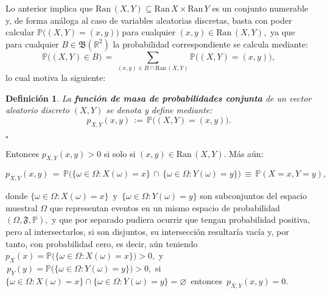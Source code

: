 \documentclass[spanish,10pt,letterpaper]{article}
\newtheorem{defi}{Definición}
\newcommand{\prob}{\mathbb{P}}
\newcommand{\Runo}{\mathbb{R}}
\newcommand{\qed}{\begin{flushright}$\square$\end{flushright}}
\begin{document}
Lo anterior implica que $\text{Ran}\,(X,Y)\subseteq\text{Ran}\,X\times\text{Ran}\,Y$ es un conjunto numerable y, de forma análoga al caso de variables aleatorias discretas, basta con poder calcular $\prob\big((X,Y)=(x,y)\big)$ para cualquier $(x,y)\in\text{Ran}\,(X,Y),$ ya que para cualquier $B\in\mathfrak{B}(\Runo^2)$ la probabilidad correspondiente se calcula mediante:
\begin{equation}\label{eq:probdiscreta}
    \prob\big((X,Y)\in B\big) \,=\, \sum_{(x,y)\in B\cap\text{Ran}\,(X,Y)}\prob\big((X,Y)=(x,y)\big),
\end{equation}
lo cual motiva la siguiente:

\bigskip

\begin{defi}\label{def:fmpconjunta}
    La \textbf{función de masa de probabilidades conjunta} de un vector aleatorio discreto $(X,Y)$ se denota y define mediante: $$p_{X,Y}(x,y) \,:=\, \prob\big((X,Y)=(x,y)\big).$$ \qed 
\end{defi}

\noindent Entonces $p_{X,Y}(x,y)>0$ si solo si $(x,y)\in\text{Ran}\,(X,Y).$ Más aún:

\begin{equation}\label{eq:fmpconjunta}
    p_{X,Y}(x,y) \,=\, \prob\big(\{\omega\in\Omega:X(\omega)=x\}\,\cap\,\{\omega\in\Omega:Y(\omega)=y\}\big) \,\equiv\, \prob(X=x,Y=y),
\end{equation}

\medskip 

\noindent donde $\{\omega\in\Omega:X(\omega)=x\}\,$ y $\,\{\omega\in\Omega:Y(\omega)=y\}$ son subconjuntos del espacio muestral $\Omega$ que representan eventos en un mismo espacio de probabilidad $(\Omega,\mathfrak{F},\prob),$ y que por separado pudiera ocurrir que tengan probabilidad positiva, pero al intersectarlos, si son disjuntos, su intersección resultaría vacía y, por tanto, con probabilidad cero, es decir, aún teniendo $p_X(x)=\prob\big(\{\omega\in\Omega:X(\omega)=x\}\big)>0,$ y $\,p_Y(y)=\prob\big(\{\omega\in\Omega:Y(\omega)=y\}\big)>0,$ si $\{\omega\in\Omega:X(\omega)=x\}\cap\{\omega\in\Omega:Y(\omega)=y\}=\varnothing\,$ entonces $\,p_{X,Y}(x,y)=0.$

\medskip 
\end{document}
